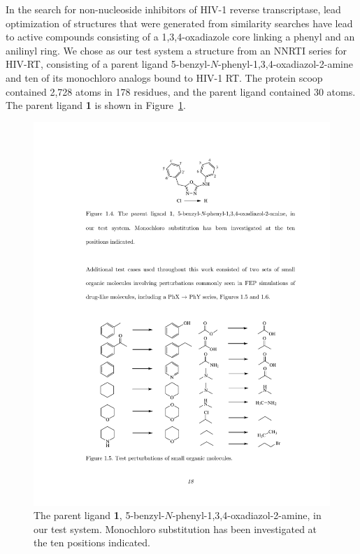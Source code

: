 \documentclass[12pt]{report}
\def\figlab{Figure}\def\figslab{\figlab s}
\newcommand*\fig[1]{\figlab~\ref{#1}}
\begin{document}
In the search for non-nucleoside inhibitors of HIV-1 reverse transcriptase, lead optimization of structures that were generated from similarity searches have lead to active compounds consisting of a 1,3,4-oxadiazole core linking a phenyl and an anilinyl ring.\cite{barreiro1, barreiro2} We chose as our test system a structure from an NNRTI series for HIV-RT, consisting of a parent ligand 5-benzyl-$N$-phenyl-1,3,4-oxadiazol-2-amine and ten of its monochloro analogs bound to HIV-1 RT. The protein scoop contained 2,728 atoms in 178 residues, and the parent ligand contained 30 atoms. The parent ligand \textbf{1} is shown in \fig{parent}. 

\begin{figure}
\centering
\includegraphics[scale=0.99]{figures/pdf/parent.pdf}
\caption{The parent ligand \textbf{1}, 5-benzyl-$N$-phenyl-1,3,4-oxadiazol-2-amine, in our test system. Monochloro substitution has been investigated at the ten positions indicated.}
\label{parent}
\end{figure}
\end{document}
